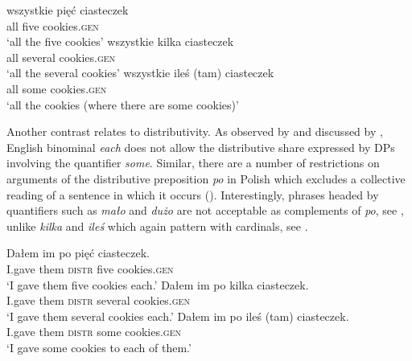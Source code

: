 \documentclass[output=paper,
]{langscibook}
\begin{document}
	\ea \label{ex:universal-quantifier-cardinals} \ea \gll wszystkie pięć ciasteczek\\
	all five cookies.\textsc{gen}\\
	\glt `all the five cookies'
	\ex \gll wszystkie kilka ciasteczek\\
	all several cookies.\textsc{gen}\\
	\glt `all the several cookies'
	\ex \gll wszystkie {ileś (tam)} ciasteczek\\
	all some cookies.\textsc{gen}\\
	\glt `all the cookies (where there are some cookies)'
	\z
    \z

	\ea \label{ex:universal-quantifier-malo} 
	\z
    \z

	\noindent Another contrast relates to distributivity. As observed by \cite{safir_stowell1988binominal} and discussed by \cite{borer2005name}, English binominal \textit{each} does not allow the distributive share expressed by DPs involving the quantifier \textit{some}. Similar, there are a number of restrictions on arguments of the distributive preposition \textit{po} in Polish which excludes a collective reading of a sentence in which it occurs (\citealt{przepiorkowski2008generalised}). Interestingly, phrases headed by quantifiers such as \textit{mało} and \textit{dużo} are not acceptable as complements of \textit{po}, see , unlike \textit{kilka} and \textit{ileś} which again pattern with cardinals, see .
	
	\ea \label{ex:distributive-po-cardinals} \ea \gll Dałem im po pięć ciasteczek.\\
	I.gave them \textsc{distr} five cookies.\textsc{gen}\\
	\glt `I gave them five cookies each.'
	\ex \gll Dałem im po kilka ciasteczek.\\
	I.gave them \textsc{distr} several cookies.\textsc{gen}\\
	\glt `I gave them several cookies each.'
	\ex \gll Dałem im po {ileś (tam)} ciasteczek.\\
	I.gave them \textsc{distr} some cookies.\textsc{gen}\\
	\glt `I gave some cookies to each of them.'
	\z
    \z
\end{document}
